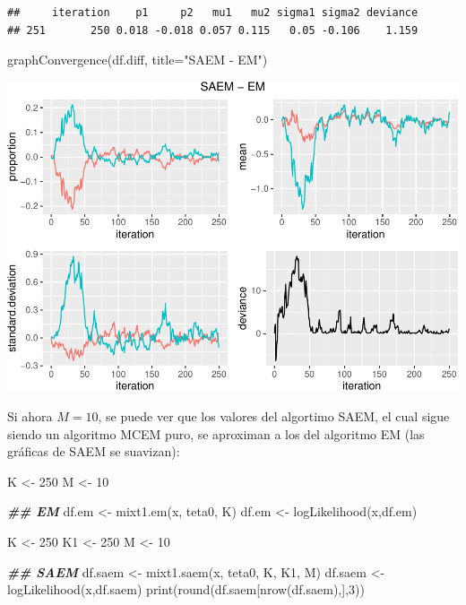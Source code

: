 \documentclass[
]{article}
\newenvironment{Shaded}{\begin{snugshade}}{\end{snugshade}}
\newcommand{\AttributeTok}[1]{\textcolor[rgb]{0.77,0.63,0.00}{#1}}
\newcommand{\DecValTok}[1]{\textcolor[rgb]{0.00,0.00,0.81}{#1}}
\newcommand{\DocumentationTok}[1]{\textcolor[rgb]{0.56,0.35,0.01}{\textbf{\textit{#1}}}}
\newcommand{\FunctionTok}[1]{\textcolor[rgb]{0.00,0.00,0.00}{#1}}
\newcommand{\NormalTok}[1]{#1}
\newcommand{\OtherTok}[1]{\textcolor[rgb]{0.56,0.35,0.01}{#1}}
\newcommand{\StringTok}[1]{\textcolor[rgb]{0.31,0.60,0.02}{#1}}
\begin{document}
\begin{verbatim}
##     iteration    p1     p2   mu1   mu2 sigma1 sigma2 deviance
## 251       250 0.018 -0.018 0.057 0.115   0.05 -0.106    1.159
\end{verbatim}

\begin{Shaded}
\begin{Highlighting}[]
\FunctionTok{graphConvergence}\NormalTok{(df.diff, }\AttributeTok{title=}\StringTok{"SAEM {-} EM"}\NormalTok{)}
\end{Highlighting}
\end{Shaded}

\includegraphics{Reporte0108_files/figure-latex/unnamed-chunk-11-1.pdf}

Si ahora \(M=10\), se puede ver que los valores del algortimo SAEM, el
cual sigue siendo un algoritmo MCEM puro, se aproximan a los del
algoritmo EM (las gráficas de SAEM se suavizan):

\begin{Shaded}
\begin{Highlighting}[]
\NormalTok{K }\OtherTok{\textless{}{-}} \DecValTok{250}
\NormalTok{M }\OtherTok{\textless{}{-}} \DecValTok{10}

\DocumentationTok{\#\#  EM}
\NormalTok{df.em }\OtherTok{\textless{}{-}} \FunctionTok{mixt1.em}\NormalTok{(x, teta0, K)}
\NormalTok{df.em }\OtherTok{\textless{}{-}} \FunctionTok{logLikelihood}\NormalTok{(x,df.em)}

\NormalTok{K }\OtherTok{\textless{}{-}} \DecValTok{250}
\NormalTok{K1 }\OtherTok{\textless{}{-}} \DecValTok{250}
\NormalTok{M }\OtherTok{\textless{}{-}} \DecValTok{10}

\DocumentationTok{\#\#  SAEM}
\NormalTok{df.saem }\OtherTok{\textless{}{-}} \FunctionTok{mixt1.saem}\NormalTok{(x, teta0, K, K1, M)}
\NormalTok{df.saem }\OtherTok{\textless{}{-}} \FunctionTok{logLikelihood}\NormalTok{(x,df.saem)}
\FunctionTok{print}\NormalTok{(}\FunctionTok{round}\NormalTok{(df.saem[}\FunctionTok{nrow}\NormalTok{(df.saem),],}\DecValTok{3}\NormalTok{))}
\end{Highlighting}
\end{Shaded}
\end{document}
